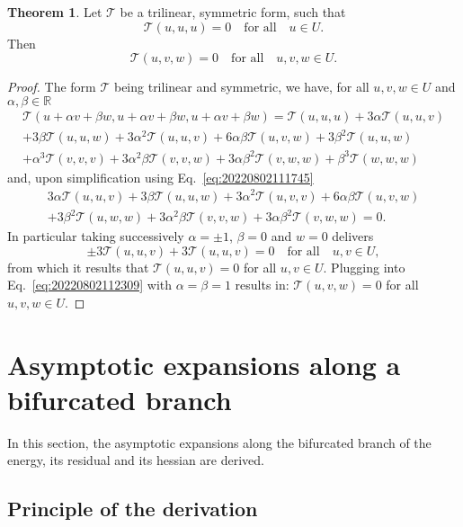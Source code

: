 \documentclass[12pt, final]{scrartcl}
\theoremstyle{definition}
\newtheorem{theorem}{Theorem}
\begin{document}
\begin{theorem}
  \label{thr:20220802112835}
  Let $𝒯$ be a trilinear, symmetric form, such that
  \begin{equation}
    \label{eq:20220802111745}
    𝒯(u, u, u) = 0 \quad \text{for all} \quad u \in U.
  \end{equation}
  Then
  \begin{equation}
    𝒯(u, v, w) = 0 \quad \text{for all} \quad u, v, w \in U.
  \end{equation}
\end{theorem}
\begin{proof}
  The form $𝒯$ being trilinear and symmetric, we have, for all $u, v, w \in U$
  and $α, β \in ℝ$
  \begin{multline*}
    𝒯(u + αv + βw, u + αv + βw, u + αv + βw) = 𝒯(u, u, u) + 3α 𝒯(u, u, v)\\
    + 3β 𝒯(u, u, w) + 3α^2 𝒯(u, u, v) + 6 α β 𝒯(u, v, w) + 3 β^2 𝒯(u, u, w)\\
    + α^3 𝒯(v, v, v) + 3 α^2 β 𝒯(v, v, w) + 3 α β^2 𝒯(v, w, w) + β^3 𝒯(w, w, w)
  \end{multline*}
  and, upon simplification using Eq.~\eqref{eq:20220802111745}
  \begin{multline}
    \label{eq:20220802112309}
    3α 𝒯(u, u, v) + 3β 𝒯(u, u, w) + 3α^2 𝒯(u, v, v) + 6 α β 𝒯(u, v, w)\\
    + 3 β^2 𝒯(u, w, w) + 3 α^2 β 𝒯(v, v, w) + 3 α β^2 𝒯(v, w, w) = 0.
  \end{multline}
  In particular taking successively $α = ±1$, $β = 0$ and $w = 0$ delivers
  \begin{equation*}
    ±3 𝒯(u, u, v) + 3 𝒯(u, u, v) = 0 \quad \text{for all} \quad u, v \in U,
  \end{equation*}
  from which it results that $𝒯(u, u, v) = 0$ for all $u, v \in U$. Plugging
  into Eq.~\eqref{eq:20220802112309} with $α = β = 1$ results in:
  $𝒯(u, v, w) = 0$ for all $u, v, w \in U$.
\end{proof}

\section{Asymptotic expansions along a bifurcated branch}
\label{sec:20220905060440}

In this section, the asymptotic expansions along the bifurcated branch of the
energy, its residual and its hessian are derived.

\subsection{Principle of the derivation}
\label{sec:20220107121442}
%
\end{document}
